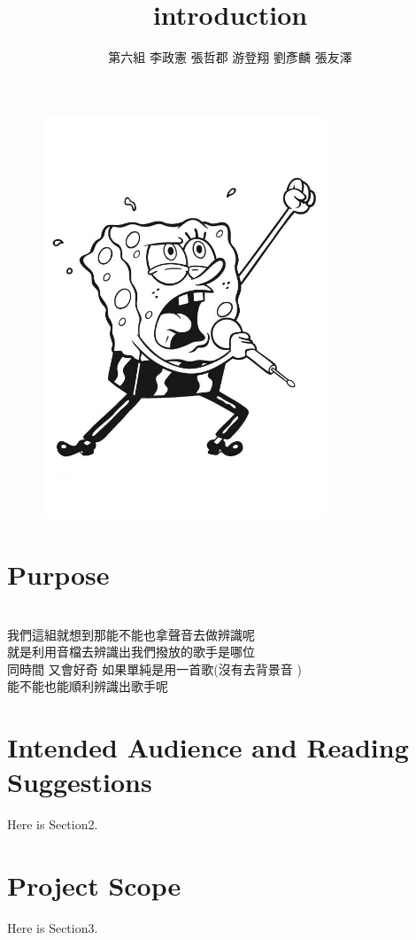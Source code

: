 \documentclass{article}
\begin{document}
\begin{CJK}{UTF8}{bkai}
\title{ }
\author{第六組   李政憲 張哲郡 游登翔 劉彥麟 張友澤}
\maketitle
\begin{figure}[h]
\begin{center}
\includegraphics[width=8.5cm]{sing.jpg}
\end{center}
\label{fig:1}
\end{figure}

\newpage
\title{\huge\bf  introduction}
\section*{Purpose}
\\ 我們這組就想到那能不能也拿聲音去做辨識呢\\ 就是利用音檔去辨識出我們撥放的歌手是哪位
\\同時間 又會好奇 如果單純是用一首歌(沒有去背景音 )\\
能不能也能順利辨識出歌手呢
\section*{Intended Audience and Reading Suggestions}
Here is Section2.
\section*{Project Scope}
Here is Section3.
\newpage



\end{CJK}
\end{document}
